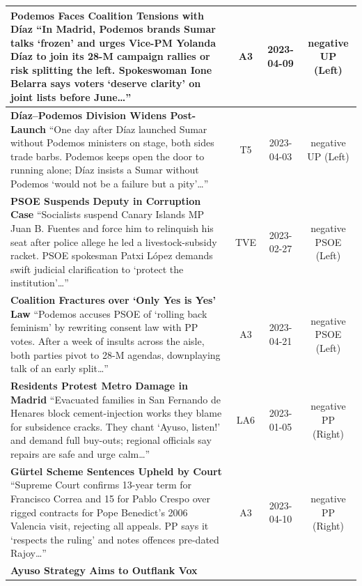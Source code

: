 \documentclass[12pt]{article}
\begin{document}
\begin{longtable}{|p{8cm}|c|c|c|}
\hline
\textbf{Podemos Faces Coalition Tensions with Díaz}\newline
{\scriptsize
	“In Madrid, Podemos brands Sumar talks ‘frozen’ and urges Vice-PM Yolanda Díaz to join its 28-M campaign rallies or risk splitting the left.  
	Spokeswoman Ione Belarra says voters ‘deserve clarity’ on joint lists before June…”}
& A3 & 2023-04-09 & negative UP (Left)\\
\hline
\textbf{Díaz–Podemos Division Widens Post-Launch}\newline
{\scriptsize
	“One day after Díaz launched Sumar without Podemos ministers on stage, both sides trade barbs.  
	Podemos keeps open the door to running alone; Díaz insists a Sumar without Podemos ‘would not be a failure but a pity’…”}
& T5 & 2023-04-03 & negative UP (Left)\\
\hline
\textbf{PSOE Suspends Deputy in Corruption Case}\newline
{\scriptsize
	“Socialists suspend Canary Islands MP Juan B. Fuentes and force him to relinquish his seat after police allege he led a livestock-subsidy racket.  
	PSOE spokesman Patxi López demands swift judicial clarification to ‘protect the institution’…”}
& TVE & 2023-02-27 & negative PSOE (Left)\\
\hline
\textbf{Coalition Fractures over ‘Only Yes is Yes’ Law}\newline
{\scriptsize
	“Podemos accuses PSOE of ‘rolling back feminism’ by rewriting consent law with PP votes.  
	After a week of insults across the aisle, both parties pivot to 28-M agendas, downplaying talk of an early split…”}
& A3 & 2023-04-21 & negative PSOE (Left)\\
\hline
\textbf{Residents Protest Metro Damage in Madrid}\newline
{\scriptsize
	“Evacuated families in San Fernando de Henares block cement-injection works they blame for subsidence cracks.  
	They chant ‘Ayuso, listen!’ and demand full buy-outs; regional officials say repairs are safe and urge calm…”}
& LA6 & 2023-01-05 & negative PP (Right)\\
\hline
\textbf{Gürtel Scheme Sentences Upheld by Court}\newline
{\scriptsize
	“Supreme Court confirms 13-year term for Francisco Correa and 15 for Pablo Crespo over rigged contracts for Pope Benedict’s 2006 Valencia visit, rejecting all appeals.  
	PP says it ‘respects the ruling’ and notes offences pre-dated Rajoy…”}
& A3 & 2023-04-10 & negative PP (Right)\\
\hline
\textbf{Ayuso Strategy Aims to Outflank Vox}\newline

\end{longtable}
\end{document}
